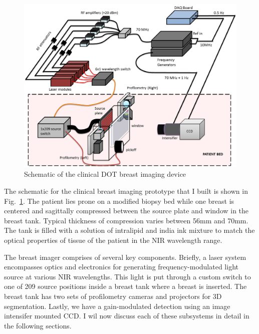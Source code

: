 \begin{figure}[ht]
\begin{center}
\includegraphics[width=14.5cm]{./figures/4_Gen3/gen3schem.png}
\caption{Schematic of the clinical DOT breast imaging device}
\label{fig:gen3schem}
\end{center}
\end{figure}
The schematic for the clinical breast imaging prototype that I built is shown in Fig.~\ref{fig:gen3schem}. The patient lies prone on a modified biopsy bed while one breast is centered and sagittally compressed between the source plate and window in the breast tank. Typical thickness of compression varies between 56mm and 70mm. The tank is filled with a solution of intralipid and india ink mixture to match the optical properties of tissue of the patient in the NIR wavelength range.

The breast imager comprises of several key components. Briefly, a laser system encompasses optics and electronics for generating frequency-modulated light source at various NIR wavelengths. This light is put through a custom switch to one of 209 source positions inside a breast tank where a breast is inserted. The breast tank has two sets of profilometry cameras and projectors for 3D segmentation. Lastly, we have a gain-modulated detection using an image intensifer mounted CCD. I wil now discuss each of these subsystems in detail in the following sections.


